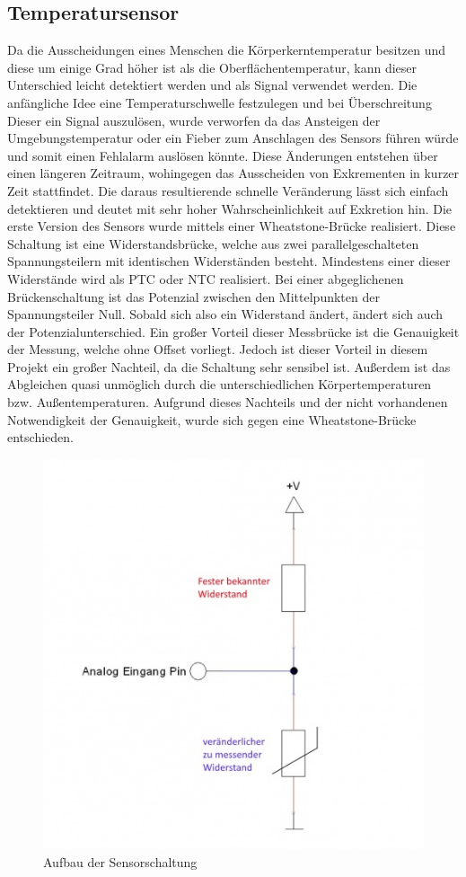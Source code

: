 \subsection{Temperatursensor}
Da die Ausscheidungen eines Menschen die Körperkerntemperatur besitzen
und diese um einige Grad höher ist als die Oberflächentemperatur, kann
dieser Unterschied leicht detektiert werden und als Signal verwendet
werden. Die anfängliche Idee eine Temperaturschwelle festzulegen und
bei Überschreitung Dieser ein Signal auszulösen, wurde verworfen da
das Ansteigen der Umgebungstemperatur oder ein Fieber zum Anschlagen
des Sensors führen würde und somit einen Fehlalarm auslösen könnte.
Diese Änderungen entstehen über einen längeren Zeitraum, wohingegen
das Ausscheiden von Exkrementen in kurzer Zeit stattfindet. Die daraus
resultierende schnelle Veränderung lässt sich einfach detektieren und
deutet mit sehr hoher Wahrscheinlichkeit auf Exkretion hin.
Die erste Version des Sensors wurde mittels einer Wheatstone-Brücke
realisiert. Diese Schaltung ist eine Widerstandsbrücke, welche aus
zwei parallelgeschalteten Spannungsteilern mit identischen
Widerständen besteht. Mindestens einer dieser Widerstände wird als PTC
oder NTC realisiert. Bei einer abgeglichenen Brückenschaltung ist das
Potenzial zwischen den Mittelpunkten der Spannungsteiler Null. Sobald
sich also ein Widerstand ändert, ändert sich auch der
Potenzialunterschied. Ein großer Vorteil dieser Messbrücke ist die
Genauigkeit der Messung, welche ohne Offset vorliegt. Jedoch ist
dieser Vorteil in diesem Projekt ein großer Nachteil, da die Schaltung
sehr sensibel ist. Außerdem ist das Abgleichen quasi unmöglich durch
die unterschiedlichen Körpertemperaturen bzw. Außentemperaturen. 
Aufgrund dieses Nachteils und der nicht vorhandenen Notwendigkeit der
Genauigkeit, wurde sich gegen eine Wheatstone-Brücke entschieden.

\begin{figure}
\centering
\includegraphics[width=.6\textwidth]{includes/sensor_pics/486px-KY-013_VoltDivide.jpg}
\caption{Aufbau der Sensorschaltung}
\label{fig:tempsens}
\end{figure}

